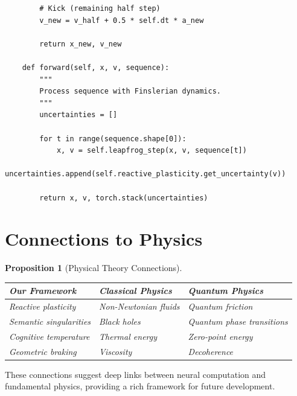 \documentclass[12pt,letterpaper,twoside]{article}
\newtheorem{prop}{Proposition}[section]
\begin{document}
\begin{verbatim}
        # Kick (remaining half step)
        v_new = v_half + 0.5 * self.dt * a_new
        
        return x_new, v_new
    
    def forward(self, x, v, sequence):
        """
        Process sequence with Finslerian dynamics.
        """
        uncertainties = []
        
        for t in range(sequence.shape[0]):
            x, v = self.leapfrog_step(x, v, sequence[t])
            uncertainties.append(self.reactive_plasticity.get_uncertainty(v))
        
        return x, v, torch.stack(uncertainties)
\end{verbatim}

\section{Connections to Physics}

\begin{prop}[Physical Theory Connections]
\begin{center}
\begin{tabular}{p{}p{}p{}}
\toprule
Our Framework & Classical Physics & Quantum Physics \\ \midrule
Reactive plasticity & Non-Newtonian fluids & Quantum friction \\
Semantic singularities & Black holes & Quantum phase transitions \\
Cognitive temperature & Thermal energy & Zero-point energy \\
Geometric braking & Viscosity & Decoherence \\ \bottomrule
\end{tabular}
\end{center}
\end{prop}

These connections suggest deep links between neural computation and fundamental physics, providing a rich framework for future development.
\end{document}
